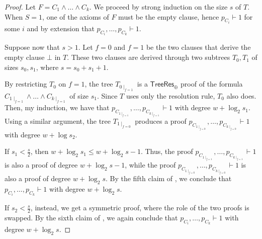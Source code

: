 \begin{proof}
    Let $F = C_1 \land \ldots \land C_k$. We proceed by strong induction on the size $s$ of $T$. When $S = 1$, one of the axioms of $F$ must be the empty clause, hence $p_{C_i} \vdash 1$ for some $i$ and by extension that $p_{C_i}, \ldots, p_{C_k} \vdash 1$.

    Suppose now that $s > 1$. Let $f = 0$ and $f = 1$ be the two clauses that derive the empty clause $\bot$ in $T$. These two clauses are derived through two subtrees $T_0, T_1$ of sizes $s_0, s_1$, where $s = s_0+s_1+1$. 
    
    By restricting $T_0$ on $f = 1$, the tree $T_{0 \mid_{f = 1}}$ is a $\mathsf{TreeRes}_\oplus$ proof of the formula $C_{1 \mid_{f = 1}} \land \ldots \land C_{k \mid_{f = 1}}$ of size $s_1$. Since $T$ uses only the resolution rule, $T_0$ also does. Then, my induction, we have that $p_{C_{1 \mid_{f = 1}}}, \ldots, p_{C_{k \mid_{f = 1}}} \vdash 1$ with degree $w + \log_2 s_1$. Using a similar argument, the tree $T_{1 \mid_{f = 0}}$ produces a proof $p_{C_{1 \mid_{f = 0}}}, \ldots, p_{C_{k \mid_{f = 0}}} \vdash 1$ with degree $w + \log s_2$.

    If $s_1 < \frac{s}{2}$, then $w + \log_2 s_1 \leq w + \log_2 s - 1$. Thus, the proof $p_{C_{1 \mid_{f = 1}}}, \ldots, p_{C_{k \mid_{f = 1}}} \vdash 1$ is also a proof of degree $w + \log_2 s - 1$, while the proof $p_{C_{1 \mid_{f = 0}}}, \ldots, p_{C_{k \mid_{f = 0}}} \vdash 1$ is also a proof of degree $w + \log_2 s$. By the fifth claim of , we conclude that $p_{C_i}, \ldots, p_{C_k} \vdash 1$ with degree $w + \log_2 s$.

    If $s_2 < \frac{s}{2}$, instead, we get a symmetric proof, where the role of the two proofs is swapped. By the sixth claim of , we again conclude that $p_{C_i}, \ldots, p_{C_k} \vdash 1$ with degree $w + \log_2 s$.
\end{proof}

